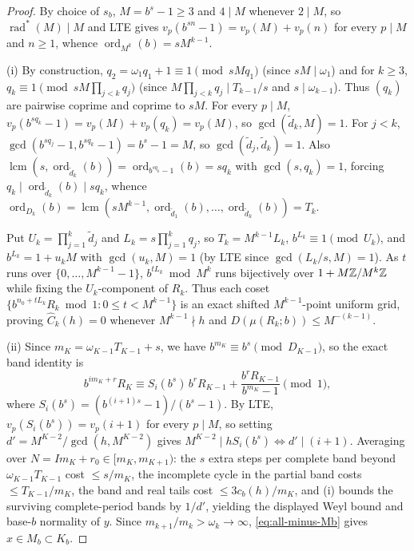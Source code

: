 \documentclass[11pt]{article}
\DeclareMathOperator{\ord}{ord}
\DeclareMathOperator{\lcm}{lcm}
\DeclareMathOperator{\rad}{rad}
\begin{document}
\begin{proof}
By choice of $s_b$, $M=b^s-1\ge3$ and $4\mid M$ whenever $2\mid M$, so $\rad^*(M)\mid M$ and LTE gives $v_p(b^{sn}-1)=v_p(M)+v_p(n)$ for every $p\mid M$ and $n\ge1$, whence $\ord_{M^k}(b)=sM^{k-1}$.

(i) By construction, $q_2=\omega_1q_1+1\equiv1\pmod{sMq_1}$ (since $sM\mid\omega_1$) and for $k\ge3$, $q_k\equiv1\pmod{sM\prod_{j<k}q_j}$ (since $M\prod_{j<k}q_j\mid T_{k-1}/s$ and $s\mid\omega_{k-1}$). Thus $(q_k)$ are pairwise coprime and coprime to $sM$. For every $p\mid M$, $v_p(b^{sq_k}-1)=v_p(M)+v_p(q_k)=v_p(M)$, so $\gcd(\widetilde d_k,M)=1$. For $j<k$, $\gcd(b^{sq_j}-1,b^{sq_k}-1)=b^s-1=M$, so $\gcd(\widetilde d_j,\widetilde d_k)=1$. Also $\lcm(s,\ord_{\widetilde d_k}(b))=\ord_{b^{sq_k}-1}(b)=sq_k$ with $\gcd(s,q_k)=1$, forcing $q_k\mid\ord_{\widetilde d_k}(b)\mid sq_k$, whence $\ord_{D_k}(b)=\lcm(sM^{k-1},\ord_{\widetilde d_1}(b),\dots,\ord_{\widetilde d_k}(b))=T_k$.

Put $U_k=\prod_{j=1}^k\widetilde d_j$ and $L_k=s\prod_{j=1}^k q_j$, so $T_k=M^{k-1}L_k$, $b^{L_k}\equiv1\pmod{U_k}$, and $b^{L_k}=1+u_kM$ with $\gcd(u_k,M)=1$ (by LTE since $\gcd(L_k/s,M)=1$). As $t$ runs over $\{0,\dots,M^{k-1}-1\}$, $b^{tL_k}\bmod M^k$ runs bijectively over $1+M\mathbb Z/M^k\mathbb Z$ while fixing the $U_k$-component of $R_k$. Thus each coset $\{b^{n_0+tL_k}R_k\bmod1:0\le t<M^{k-1}\}$ is an exact shifted $M^{k-1}$-point uniform grid, proving $\widehat C_k(h)=0$ whenever $M^{k-1}\nmid h$ and $D(\mu(R_k;b))\le M^{-(k-1)}$.

(ii) Since $m_K=\omega_{K-1}T_{K-1}+s$, we have $b^{m_K}\equiv b^s\pmod{D_{K-1}}$, so the exact band identity is
\[
b^{im_K+r}R_K\equiv S_i(b^s)\,b^rR_{K-1}+\frac{b^rR_{K-1}}{b^{m_K}-1}\pmod1,
\]
where $S_i(b^s)=(b^{(i+1)s}-1)/(b^s-1)$. By LTE, $v_p(S_i(b^s))=v_p(i+1)$ for every $p\mid M$, so setting $d'=M^{K-2}/\gcd(h,M^{K-2})$ gives $M^{K-2}\mid hS_i(b^s)\iff d'\mid(i+1)$. Averaging over $N=Im_K+r_0\in[m_K,m_{K+1})$: the $s$ extra steps per complete band beyond $\omega_{K-1}T_{K-1}$ cost $\le s/m_K$, the incomplete cycle in the partial band costs $\le T_{K-1}/m_K$, the band and real tails cost $\le 3c_b(h)/m_K$, and (i) bounds the surviving complete-period bands by $1/d'$, yielding the displayed Weyl bound and base-$b$ normality of $y$. Since $m_{k+1}/m_k>\omega_k\to\infty$, \eqref{eq:all-minus-Mb} gives $x\in M_b\subset K_b$.


\end{proof}
\end{document}
